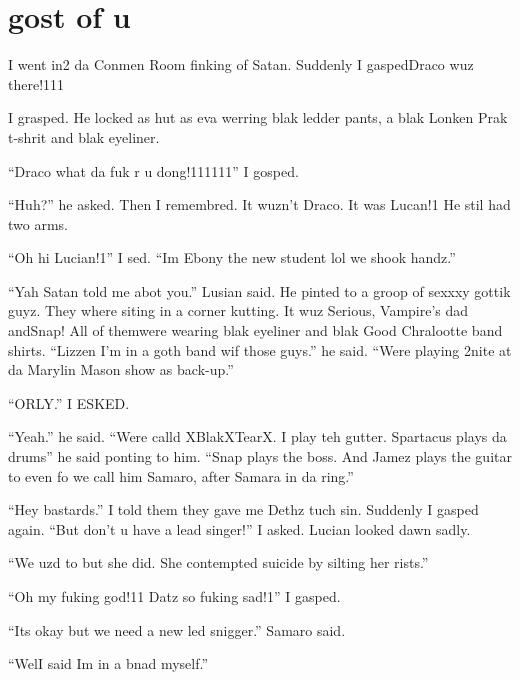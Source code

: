 \section{gost of u}


\XXX{\Xfill 666\Xfill}

I went in2 da Conmen Room finking of Satan. Suddenly I gasped\dotfill Draco wuz there!111

I grasped. He locked as hut as eva werring blak ledder pants, a blak Lonken Prak t-shrit and blak eyeliner.

\enquote{Draco what da fuk r u dong!111111} I gosped.

\enquote{Huh?} he asked. Then I remembred. It wuzn't Draco. It was Lucan!1 He stil had two arms.

\enquote{Oh hi Lucian!1} I sed. \enquote{Im Ebony the new student lol we shook handz.}

\enquote{Yah Satan told me abot you.} Lusian said. He pinted to a groop of sexxxy gottik guyz. They where siting in a corner kutting. It wuz Serious, Vampire's dad and\dotfill Snap! All of them\newline were wearing blak eyeliner and blak Good Chralootte band shirts. \enquote{Lizzen I'm in a goth band wif those guys.} he said. \enquote{Were playing 2nite at da Marylin Mason show as back-up.}

\enquote{ORLY.} I ESKED\@.

\enquote{Yeah.} he said. \enquote{Were calld XBlakXTearX. I play teh gutter. Spartacus plays da drums} he said ponting to him. \enquote{Snap plays the boss. And Jamez plays the guitar to even fo we call him Samaro, after Samara in da ring.}

\enquote{Hey bastards.} I told them they gave me Dethz tuch sin. Suddenly I gasped again. \enquote{But don't u have a lead singer!} I asked. Lucian looked dawn sadly.

\enquote{We uzd to but she did. She contempted suicide by silting her rists.}

\enquote{Oh my fuking god!11 Datz so fuking sad!1} I gasped.

\enquote{Its okay but we need a new led snigger.} Samaro said.

\enquote{Wel\dotfill I said Im in a bnad myself.}

